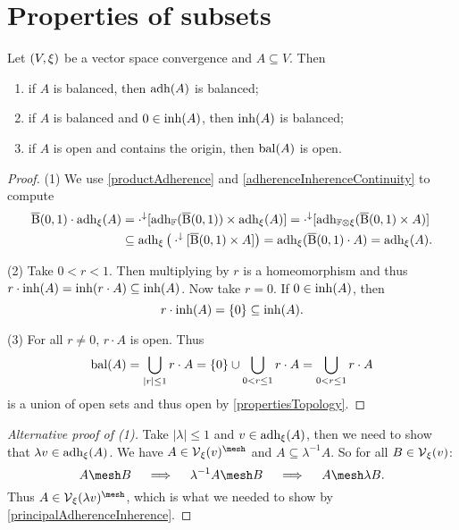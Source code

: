 \section{Properties of subsets}
\begin{proposition} \label{inherenceAdherenceBalanced}
Let $\left( V,\xi \right)$ be a vector space convergence and $A\subseteq V$. Then
\begin{enumerate}
\item if $A$ is balanced, then $\operatorname{adh}(A)$ is balanced;
\item if $A$ is balanced and $0\in\operatorname{inh}(A)$, then $\operatorname{inh}(A)$ is balanced;
\item if $A$ is open and contains the origin, then $\operatorname{bal}(A)$ is open.
\end{enumerate}
\end{proposition}
\begin{proof}
(1) We use \ref{productAdherence} and \ref{adherenceInherenceContinuity} to compute
\begin{align*}
\operatorname{\overline{B}}(0,1)\cdot \operatorname{adh}_\xi(A) &= \cdot^\downarrow[\operatorname{adh}_{\mathbb{F}}(\operatorname{\overline{B}}(0,1))\times \operatorname{adh}_\xi(A)] = \cdot^\downarrow[\operatorname{adh}_{\mathbb{F}\otimes \xi}(\operatorname{\overline{B}}(0,1)\times A)] \\
&\subseteq \operatorname{adh}_{\xi}\big(\cdot^\downarrow[\operatorname{\overline{B}}(0,1)\times A]\big) = \operatorname{adh}_{\xi}(\operatorname{\overline{B}}(0,1)\cdot A) = \operatorname{adh}_\xi(A).
\end{align*}

(2) Take $0<r<1$. Then multiplying by $r$ is a homeomorphism and thus $r\cdot\operatorname{inh}(A) = \operatorname{inh}(r\cdot A) \subseteq \operatorname{inh}(A)$. Now take $r=0$. If $0\in\operatorname{inh}(A)$, then
\[ r\cdot\operatorname{inh}(A) = \{0\} \subseteq \operatorname{inh}(A). \]

(3) For all $r\neq 0$, $r\cdot A$ is open. Thus
\[ \operatorname{bal}(A) = \bigcup_{|r|\leq 1}r\cdot A = \{0\}\cup \bigcup_{0< r\leq 1}r\cdot A = \bigcup_{0< r\leq 1}r\cdot A \]
is a union of open sets and thus open by \ref{propertiesTopology}.
\end{proof}
\begin{proof}[Alternative proof of (1)]
Take $|\lambda|\leq 1$ and $v\in \operatorname{adh}_\xi(A)$, then we need to show that $\lambda v \in \operatorname{adh}_\xi(A)$. We have $A\in \vicinity_\xi(v)^{\mesh}$ and $A\subseteq \lambda^{-1}A$. So for all $B\in \operatorname{\mathcal{V}}_\xi(v)$:
\[ A\mesh B \quad\implies\quad \lambda^{-1}A\mesh B \quad\implies\quad A\mesh \lambda B. \]
Thus $A\in \vicinity_\xi(\lambda v)^{\mesh}$, which is what we needed to show by \ref{principalAdherenceInherence}.
\end{proof}

